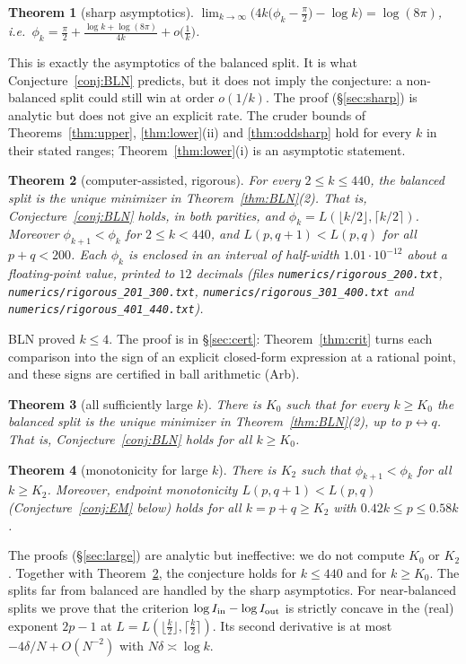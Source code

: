 \documentclass[11pt]{amsart}
\newtheorem{theorem}{Theorem}
\theoremstyle{definition}
\begin{document}
\begin{theorem}[sharp asymptotics]\label{thm:sharp}
$\displaystyle\lim_{k\to\infty}\Big(4k\big(\phi_k-\tfrac\pi2\big)-\log k\Big)=\log(8\pi)$, i.e.\
$\phi_k=\frac\pi2+\frac{\log k+\log(8\pi)}{4k}+o\big(\frac1k\big)$.
\end{theorem}
\noindent This is exactly the asymptotics of the balanced split. It is what Conjecture~\ref{conj:BLN} predicts, but it does not imply the
conjecture: a non-balanced split could still win at order $o(1/k)$. The proof (\S\ref{sec:sharp}) is analytic but does not give an explicit
rate. The cruder bounds of Theorems~\ref{thm:upper}, \ref{thm:lower}(ii) and \ref{thm:oddsharp} hold for every $k$ in their stated
ranges; Theorem~\ref{thm:lower}(i) is an asymptotic statement.

\begin{theorem}[computer-assisted, rigorous]\label{thm:cert}
For every $2\le k\le440$, the balanced split is the unique minimizer in Theorem~\ref{thm:BLN}(2). That is, Conjecture~\ref{conj:BLN}
holds, in both parities, and $\phi_k=L(\lfloor k/2\rfloor,\lceil k/2\rceil)$. Moreover $\phi_{k+1}<\phi_k$ for $2\le k<440$, and
$L(p,q+1)<L(p,q)$ for all $p+q<200$. Each $\phi_k$ is enclosed in an interval of half-width $1.01\cdot10^{-12}$ about a floating-point
value, printed to $12$ decimals (files \texttt{numerics/rigorous\_200.txt}, \texttt{numerics/rigorous\_201\_300.txt},
\texttt{numerics/rigorous\_301\_400.txt} and \texttt{numerics/rigorous\_401\_440.txt}).
\end{theorem}
\noindent BLN proved $k\le4$. The proof is in \S\ref{sec:cert}: Theorem~\ref{thm:crit} turns each comparison into the sign of an explicit
closed-form expression at a rational point, and these signs are certified in ball arithmetic (Arb).

\begin{theorem}[all sufficiently large $k$]\label{thm:large}
There is $K_0$ such that for every $k\ge K_0$ the balanced split is the unique minimizer in Theorem~\ref{thm:BLN}(2), up to $p\leftrightarrow q$.
That is, Conjecture~\ref{conj:BLN} holds for all $k\ge K_0$.
\end{theorem}
\begin{theorem}[monotonicity for large $k$]\label{thm:mono}
There is $K_2$ such that $\phi_{k+1}<\phi_k$ for all $k\ge K_2$. Moreover, endpoint monotonicity $L(p,q+1)<L(p,q)$ (Conjecture~\ref{conj:EM} below)
holds for all $k=p+q\ge K_2$ with $0.42k\le p\le0.58k$.
\end{theorem}
\noindent The proofs (\S\ref{sec:large}) are analytic but ineffective: we do not compute $K_0$ or $K_2$. Together with Theorem~\ref{thm:cert}, the conjecture
holds for $k\le440$ and for $k\ge K_0$. The splits far from balanced are handled by the sharp asymptotics. For near-balanced splits we prove that the
criterion $\log I_{\rm in}-\log I_{\rm out}$ is strictly concave in the (real) exponent $2p-1$ at $L=L(\lfloor\frac k2\rfloor,\lceil\frac k2\rceil)$.
Its second derivative is at most $-4\delta/N+O(N^{-2})$ with $N\delta\asymp\log k$.
\end{document}
